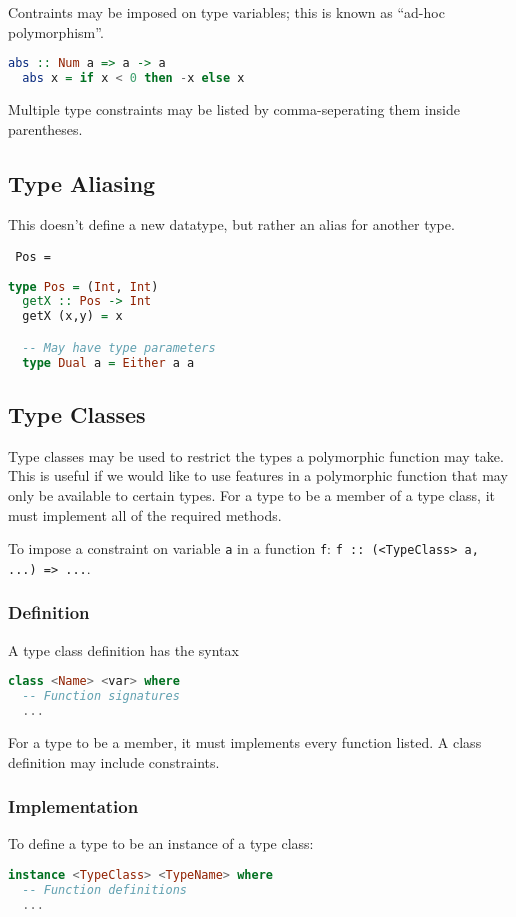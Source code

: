 Contraints may be imposed on type variables; this is known as ``ad-hoc polymorphism''.
\begin{lstlisting}[language=haskell]
  abs :: Num a => a -> a
  abs x = if x < 0 then -x else x
\end{lstlisting}
Multiple type constraints may be listed by comma-seperating them inside parentheses.

\subsection{Type Aliasing}
This doesn't define a new datatype, but rather an alias for another type.
\begin{center}
  \texttt{ Pos = }
\end{center}

\begin{lstlisting}[language=haskell]
  type Pos = (Int, Int)
  getX :: Pos -> Int
  getX (x,y) = x

  -- May have type parameters
  type Dual a = Either a a
\end{lstlisting}

\subsection{Type Classes}
Type classes may be used to restrict the types a polymorphic function may take. This is useful if we would like to use features in a polymorphic function that may only be available to certain types. For a type to be a member of a type class, it must implement all of the required methods.

To impose a constraint on variable \texttt{a} in a function \texttt{f}: \texttt{f :: (\texttt<TypeClass> a, ...) => ...}.

\subsubsection{Definition}
A type class definition has the syntax
\begin{lstlisting}[language=haskell]
class <Name> <var> where
  -- Function signatures
  ...
\end{lstlisting}
For a type to be a member, it must implements every function listed. A class definition may include constraints.

\subsubsection{Implementation}
To define a type to be an instance of a type class:
\begin{lstlisting}[language=haskell]
instance <TypeClass> <TypeName> where
  -- Function definitions
  ...
\end{lstlisting}

